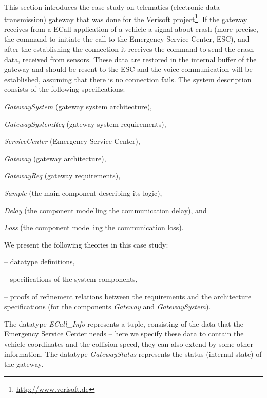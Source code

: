 This section introduces the case study on telematics 
(electronic data transmission) gateway that was done for the 
Verisoft project\footnote{\url{http://www.verisoft.de}}. 
If the gateway receives from a ECall application of a vehicle
a signal about crash 
(more precise, the command to initiate the call to the Emergency Service Center, ESC), 
and after the establishing the connection it receives 
 the command to send the crash data, received from sensors.
These data are restored 
 in the internal buffer of the gateway  and should  
 be resent to the ESC and 
 the voice communication will be established, assuming that
  there is no connection fails.  
The system description consists of the following specifications: 
\begin{itemize*}
  \item \emph{GatewaySystem} (gateway system architecture), 
  \item \emph{GatewaySystemReq} (gateway system requirements), 
  \item \emph{ServiceCenter} (Emergency Service Center),
  \item \emph{Gateway} (gateway architecture), 
  \item \emph{GatewayReq} (gateway requirements),
  \item \emph{Sample} (the main  component describing its logic), 
  \item \emph{Delay} (the  component   modelling the communication delay), and
  \item \emph{Loss} (the  component modelling the communication loss).  
\end{itemize*}
%  
We present the following \isah theories in this case study:
\begin{itemize*}
  \item {} --  datatype definitions, 
  \item {} --  specifications of the system components, 
  \item {} --  proofs of refinement relations between the requirements and the architecture specifications (for the components \emph{Gateway} and \emph{GatewaySystem}).
\end{itemize*}
%
The datatype \emph{ECall\_Info} represents a tuple, 
consisting of the data that the Emergency Service Center needs -- here we specify these data to contain the vehicle coordinates and the collision speed, they can also extend by some other information.  
The datatype \emph{GatewayStatus} represents the status (internal state) of the gateway.
